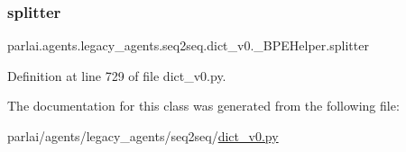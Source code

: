 \subsubsection{\texorpdfstring{splitter}{splitter}}
{\footnotesize\ttfamily parlai.\+agents.\+legacy\+\_\+agents.\+seq2seq.\+dict\+\_\+v0.\+\_\+\+B\+P\+E\+Helper.\+splitter}



Definition at line 729 of file dict\+\_\+v0.\+py.



The documentation for this class was generated from the following file\+:\begin{DoxyCompactItemize}
\item 
parlai/agents/legacy\+\_\+agents/seq2seq/\hyperlink{dict__v0_8py}{dict\+\_\+v0.\+py}\end{DoxyCompactItemize}
